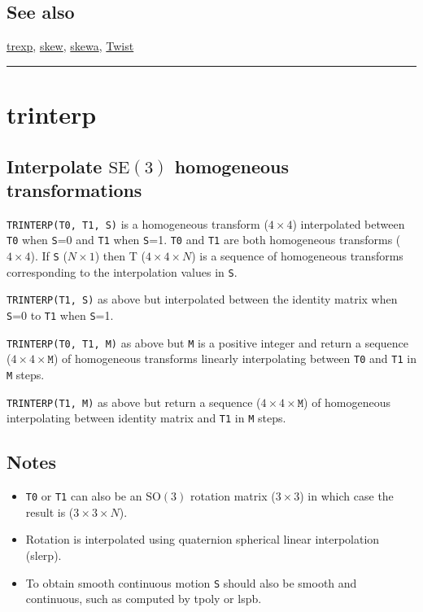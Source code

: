 \subsection*{See also}


\hyperlink{trexp}{\color{blue} trexp}, \hyperlink{skew}{\color{blue} skew}, \hyperlink{skewa}{\color{blue} skewa}, \hyperlink{Twist}{\color{blue} Twist}

\vspace{1.5ex}\rule{\textwidth}{1mm}

\hypertarget{trinterp}{\section*{trinterp}}
\subsection*{Interpolate $\mbox{SE}(3)$ homogeneous transformations}


\texttt{TRINTERP(T0, T1, S)} is a homogeneous transform ($4 \times 4$) interpolated
between \texttt{T0} when \texttt{S}=0 and \texttt{T1} when \texttt{S}=1.  \texttt{T0} and \texttt{T1} are both homogeneous
transforms ($4 \times 4$).  If \texttt{S} ($N \times 1$) then T ($4 \times 4 \times N$) is a sequence of
homogeneous transforms corresponding to the interpolation values in \texttt{S}.



\texttt{TRINTERP(T1, S)} as above but interpolated between the identity matrix
when \texttt{S}=0 to \texttt{T1} when \texttt{S}=1.



\texttt{TRINTERP(T0, T1, M)} as above but \texttt{M} is a positive integer and return a
sequence ($4 \times 4 \times \texttt{M}$) of homogeneous transforms linearly interpolating between
\texttt{T0} and \texttt{T1} in \texttt{M} steps.



\texttt{TRINTERP(T1, M)} as above but return a sequence ($4 \times 4 \times \texttt{M}$) of
homogeneous interpolating between identity matrix and \texttt{T1} in \texttt{M} steps.


\subsection*{Notes}
\begin{itemize}
  \item \texttt{T0} or \texttt{T1} can also be an $\mbox{SO}(3)$ rotation matrix ($3 \times 3$) in which case the    result is ($3 \times 3 \times N$).
  \item Rotation is interpolated using quaternion spherical linear interpolation (slerp).
  \item To obtain smooth continuous motion \texttt{S} should also be smooth and continuous,    such as computed by tpoly or lspb.
\end{itemize}

